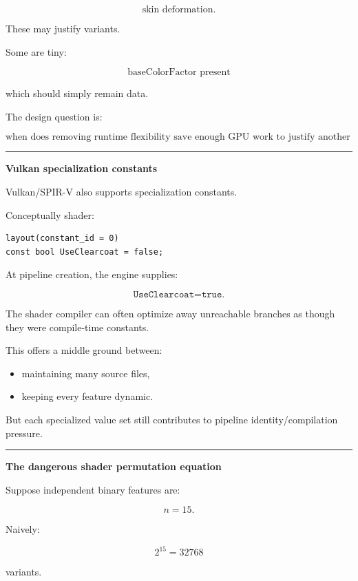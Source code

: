 \[
\text{skin deformation}.
\]

These may justify variants.

Some are tiny:

\[
\text{baseColorFactor present}
\]

which should simply remain data.

The design question is:

\[
\boxed{
\text{when does removing runtime flexibility save enough GPU work to justify another compiled variant?}
}
\]

\begin{center}\rule{0.5\linewidth}{0.5pt}\end{center}

\textbf{Vulkan specialization constants}

Vulkan/SPIR-V also supports specialization constants.

Conceptually shader:

\begin{verbatim}
layout(constant_id = 0)
const bool UseClearcoat = false;
\end{verbatim}

At pipeline creation, the engine supplies:

\[
\texttt{UseClearcoat=true}.
\]

The shader compiler can often optimize away unreachable branches as though they were compile-time constants.

This offers a middle ground between:

\begin{itemize}
\tightlist
\item
  maintaining many source files,
\item
  keeping every feature dynamic.
\end{itemize}

But each specialized value set still contributes to pipeline identity/compilation pressure.

\begin{center}\rule{0.5\linewidth}{0.5pt}\end{center}

\textbf{The dangerous shader permutation equation}

Suppose independent binary features are:

\[
n=15.
\]

Naively:

\[
2^{15}
=
32768
\]

variants.

